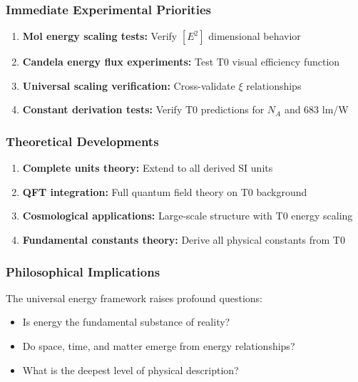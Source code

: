 \documentclass[12pt,a4paper]{article}
\newcommand{\xipar}{\xi}
\begin{document}
\subsubsection{Immediate Experimental Priorities}
\label{subsubsec:immediate_experimental}

\begin{enumerate}
	\item \textbf{Mol energy scaling tests:} Verify $[E^2]$ dimensional behavior
	\item \textbf{Candela energy flux experiments:} Test T0 visual efficiency function
	\item \textbf{Universal scaling verification:} Cross-validate $\xipar$ relationships
	\item \textbf{Constant derivation tests:} Verify T0 predictions for $N_A$ and 683 lm/W
\end{enumerate}

\subsubsection{Theoretical Developments}
\label{subsubsec:theoretical_developments}

\begin{enumerate}
	\item \textbf{Complete units theory:} Extend to all derived SI units
	\item \textbf{QFT integration:} Full quantum field theory on T0 background
	\item \textbf{Cosmological applications:} Large-scale structure with T0 energy scaling
	\item \textbf{Fundamental constants theory:} Derive all physical constants from T0
\end{enumerate}

\subsubsection{Philosophical Implications}
\label{subsubsec:philosophical_implications}

The universal energy framework raises profound questions:
\begin{itemize}
	\item Is energy the fundamental substance of reality?
	\item Do space, time, and matter emerge from energy relationships?
	\item What is the deepest level of physical description?
\end{itemize}
\end{document}

